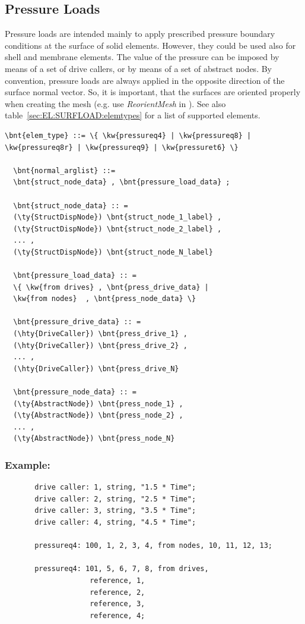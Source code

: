 \subsection{Pressure Loads}
Pressure loads are intended mainly to apply prescribed pressure boundary conditions at the surface of solid elements.
However, they could be used also for shell and membrane elements. The value of the pressure can be imposed
by means of a set of drive callers, or by means of a set of abstract nodes. By convention, pressure loads are always applied
in the opposite direction of the surface normal vector. So, it is important, that the surfaces are oriented properly
when creating the mesh (e.g. use \emph{ReorientMesh} in ).
See also table~\ref{sec:EL:SURFLOAD:elemtypes} for a list of supported elements.
\begin{Verbatim}[commandchars=\\\{\}]
  \bnt{elem_type} ::= \{ \kw{pressureq4} | \kw{pressureq8} | \kw{pressureq8r} | \kw{pressureq9} | \kw{pressuret6} \}

  \bnt{normal_arglist} ::=
  \bnt{struct_node_data} , \bnt{pressure_load_data} ;

  \bnt{struct_node_data} :: =
  (\ty{StructDispNode}) \bnt{struct_node_1_label} ,
  (\ty{StructDispNode}) \bnt{struct_node_2_label} ,
  ... ,
  (\ty{StructDispNode}) \bnt{struct_node_N_label}

  \bnt{pressure_load_data} :: =
  \{ \kw{from drives} , \bnt{press_drive_data} |
  \kw{from nodes}  , \bnt{press_node_data} \}

  \bnt{pressure_drive_data} :: =
  (\hty{DriveCaller}) \bnt{press_drive_1} ,
  (\hty{DriveCaller}) \bnt{press_drive_2} ,
  ... ,
  (\hty{DriveCaller}) \bnt{press_drive_N}

  \bnt{pressure_node_data} :: =
  (\ty{AbstractNode}) \bnt{press_node_1} ,
  (\ty{AbstractNode}) \bnt{press_node_2} ,
  ... ,
  (\ty{AbstractNode}) \bnt{press_node_N}

\end{Verbatim}

\subsubsection{Example:}
\begin{verbatim}
       drive caller: 1, string, "1.5 * Time";
       drive caller: 2, string, "2.5 * Time";
       drive caller: 3, string, "3.5 * Time";
       drive caller: 4, string, "4.5 * Time";

       pressureq4: 100, 1, 2, 3, 4, from nodes, 10, 11, 12, 13;

       pressureq4: 101, 5, 6, 7, 8, from drives,
                    reference, 1,
                    reference, 2,
                    reference, 3,
                    reference, 4;
\end{verbatim}

